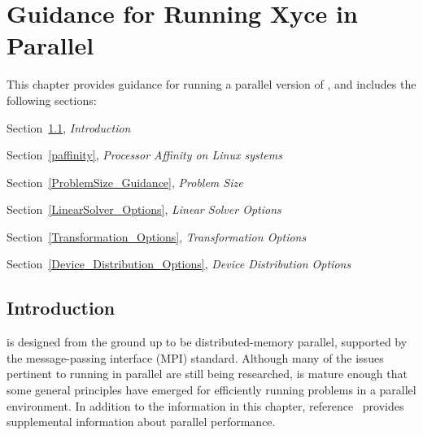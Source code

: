 


\chapter{Guidance for Running Xyce in Parallel}
\label{Parallel}

{
This chapter provides guidance for running a parallel version of \Xyce{}, and includes the following sections:
\begin{XyceItemize}
\item Section~\ref{Parallel_Introduction}, {\em Introduction}
\item Section~\ref{paffinity}, {\em Processor Affinity on Linux systems}
\item Section~\ref{ProblemSize_Guidance}, {\em Problem Size}
\item Section~\ref{LinearSolver_Options}, {\em Linear Solver Options}
\item Section~\ref{Transformation_Options}, {\em Transformation Options}
\item Section~\ref{Device_Distribution_Options}, {\em Device Distribution Options}
\end{XyceItemize}
}

\section{Introduction}
\label{Parallel_Introduction}

\Xyce{} is designed from the ground up to be distributed-memory parallel, supported by the message-passing interface (MPI)
standard. Although many of the issues pertinent to running in parallel are still being researched, \Xyce{} is mature
enough that some general principles have emerged for efficiently running
problems in a parallel environment.  In addition to the information in this chapter, reference~\cite{xyceBookChapter:2011} provides
supplemental information about \Xyce{} parallel performance. 

